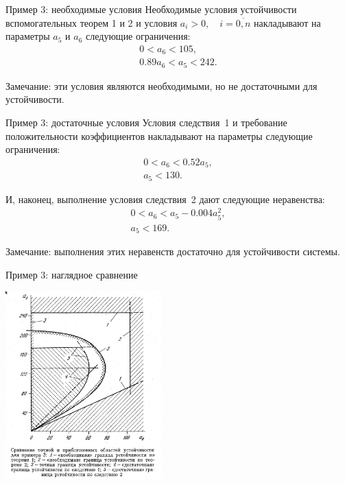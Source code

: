 \documentclass[notheorems,aspectratio=169]{beamer}
\theoremstyle{definition}
\begin{document}
\begin{frame}{Пример 3: необходимые условия}
  Необходимые условия устойчивости вспомогательных теорем 1 и 2 и условия $a_i > 0, \quad i=\overline{0,n}$ накладывают
  на параметры $a_5$ и $a_6$ следующие ограничения:
  \begin{equation*}
    \begin{gathered}
      0 < a_6 < 105, \\
      0.89 a_6 < a_5 < 242.
    \end{gathered}
  \end{equation*}

  Замечание: эти условия являются необходимыми, но не достаточными для устойчивости.
\end{frame}

\begin{frame}{Пример 3: достаточные условия}
  Условия следствия~1 и требование положительности коэффициентов накладывают на параметры следующие ограничения:
  \begin{equation*}
    \begin{gathered}
      0 < a_6 < 0.52 a_5, \\
      a_5 < 130.
    \end{gathered}
  \end{equation*}

  И, наконец, выполнение условия следствия~2 дают следующие неравенства:
  \begin{equation*}
    \begin{gathered}
      0 < a_6 < a_5 - 0.004 a_5^2, \\
      a_5 < 169.
    \end{gathered}
  \end{equation*}

  Замечание: выполнения этих неравенств достаточно для устойчивости системы.
\end{frame}

\begin{frame}{Пример 3: наглядное сравнение}
  \begin{center}
    \includegraphics[width=6cm]{Example3_Areas}
  \end{center}
\end{frame}
\end{document}
